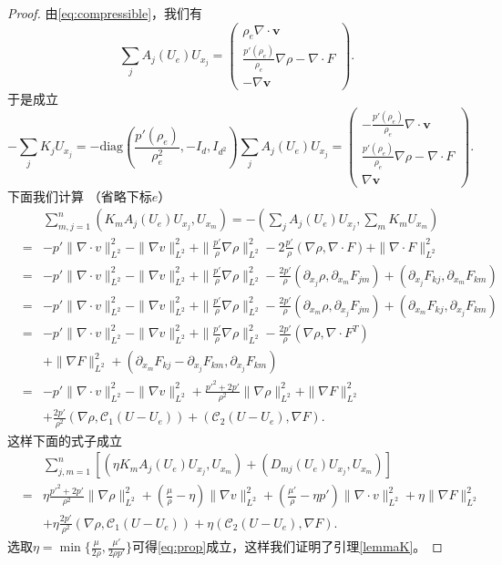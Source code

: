 \begin{proof}
由\eqref{eq:compressible}，我们有
$$
\sum_j A_j(U_e) U_{x_j}=\left( \begin{array}{cc} \rho_e\nabla\cdot\mathbf v\\ \frac{p'(\rho_e)}{\rho_e}\nabla\rho - \nabla\cdot F\\ -\nabla \mathbf v\end{array} \right).
$$
于是成立
$$
-\sum_j K_jU_{x_j}=-\mbox{diag}\left(\frac{p'(\rho_e)}{\rho_e^2}, -I_d, I_{d^2}\right)\sum_j A_j(U_e) U_{x_j}=\left( \begin{array}{cc} -\frac{p'(\rho_e)}{\rho_e}\nabla\cdot\mathbf v\\ \frac{p'(\rho_e)}{\rho_e}\nabla \rho - \nabla\cdot F\\ \nabla \mathbf v\end{array} \right).
$$
下面我们计算 （省略下标$e$）
\begin{eqnarray*}
   && \sum_{m,j=1}^n (K_m  A_j(U_e) U_{x_j},U_{x_m}) = -(\sum_j A_j(U_e) U_{x_j}, \sum_m K_m U_{x_m})\\
  &=& - p' \|\nabla \cdot  v \|_{L^2}^2 - \|\nabla v \|_{L^2}^2+ \|\frac{p'}{\rho} \nabla \rho \|_{L^2}^2 - 2\frac{p'}{\rho} (\nabla\rho, \nabla\cdot F) +  \|\nabla\cdot F\|_{L^2}^2  \\
  &=& - p' \|\nabla \cdot  v \|_{L^2}^2 - \|\nabla v \|_{L^2}^2+ \|\frac{p'}{\rho} \nabla \rho \|_{L^2}^2 -  \frac{2p'}{\rho}( \partial_{x_j} \rho,\partial_{x_m} F_{jm}) + ( \partial_{x_j} F_{kj},\partial_{x_m} F_{km})\\
     &=& - p' \|\nabla \cdot  v \|_{L^2}^2 - \|\nabla v \|_{L^2}^2+ \|\frac{p'}{\rho} \nabla \rho \|_{L^2}^2-  \frac{2p'}{\rho} (\partial_{x_m} \rho,\partial_{x_j} F_{jm}) +  ( \partial_{x_m} F_{kj},\partial_{x_j} F_{km})\\
     &=&  - p' \|\nabla \cdot  v \|_{L^2}^2 - \|\nabla v \|_{L^2}^2+ \|\frac{p'}{\rho} \nabla \rho \|_{L^2}^2-  \frac{2p'}{\rho}(\nabla \rho,\nabla\cdot F^T)\\
     && + \|\nabla F\|_{L^2}^2
     + ( \partial_{x_m} F_{kj} - \partial_{x_j} F_{km},\partial_{x_j} F_{km}) \\
     &=&  - p' \|\nabla \cdot  v \|_{L^2}^2 - \|\nabla v \|_{L^2}^2+ \frac{p'^2 + 2p'}{\rho^2} \|\nabla \rho \|_{L^2}^2+ \|\nabla F\|_{L^2}^2 \\
     &&+ \frac{2p'}{\rho^2}(\nabla \rho, {\mathcal C}_1(U - U_e)) + ({\mathcal C}_2(U - U_e), \nabla F).
\end{eqnarray*}
这样下面的式子成立
\begin{eqnarray*}
 && \sum_{j,m=1}^n[ ( \eta K_m A_j(U_e) U_{x_j},U_{x_m}) + (D_{mj}(U_e) U_{x_j},U_{x_m})] \\
  &=& \eta\frac{p'^2 + 2 p'}{\rho^2} \|\nabla \rho \|_{L^2}^2 + (\frac{\mu}{\rho} - \eta   ) \|\nabla v \|_{L^2}^2+ (\frac{\mu'}{\rho} - \eta  p' ) \|\nabla \cdot  v \|_{L^2}^2+ \eta \|\nabla F\|_{L^2}^2\\
  && + \eta\frac{2p'}{\rho^2}(\nabla \rho, {\mathcal C}_1(U - U_e)) + \eta({\mathcal C}_2(U - U_e), \nabla F).
\end{eqnarray*}
选取$\eta=\min\{ \frac{\mu}{2\rho}, \frac{\mu'}{2\rho p'}\}$可得\eqref{eq:prop}成立，这样我们证明了引理\ref{lemmaK}。
\end{proof}{}

